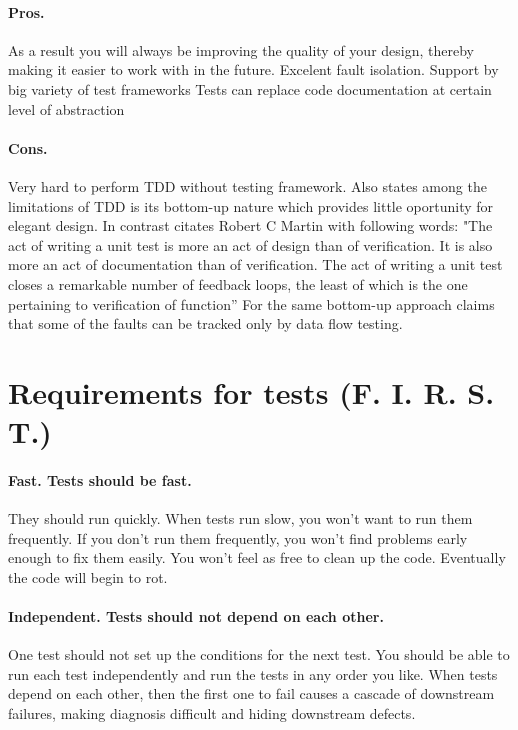 \paragraph{Pros.}
As a result you will always be improving the quality of your design, thereby making it easier to work with in the future.\cite{tdd}
Excelent fault isolation. Support by big variety of test frameworks \cite{STCraft}
Tests can replace code documentation at certain level of abstraction \cite{MartinClean}

\paragraph{Cons.}
Very hard to perform TDD without testing framework. \cite{STCraft}
Also \cite{STCraft} states among the limitations of TDD is its bottom-up nature which provides little oportunity for elegant design. In contrast \cite{tdd} citates Robert C Martin with following words: "The act of writing a unit test is more an act of design than of verification.  It is also more an act of documentation than of verification.  The act of writing a unit test closes a remarkable number of feedback loops, the least of which is the one pertaining to verification of function”  For the same bottom-up approach \cite{STCraft} claims that some of the faults can be tracked only by data flow testing.


\section{Requirements for tests (F. I. R. S. T.)}

\paragraph{Fast. Tests should be fast.} 
They should run quickly. When tests run slow, you won’t want to run them frequently. 
If you don’t run them frequently, you won’t find problems early enough to fix them easily. 
You won’t feel as free to clean up the code. Eventually the code will begin to rot.\cite{MartinClean}

\paragraph{Independent. Tests should not depend on each other.} 
One test should not set up the conditions for the next test. 
You should be able to run each test independently and run the tests in any order you like. 
When tests depend on each other, then the first one to fail causes a cascade of downstream failures, making diagnosis difficult and hiding downstream defects.\cite{MartinClean}

